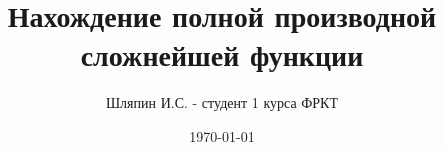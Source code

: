 \title{Нахождение полной производной сложнейшей функции}
\author{Шляпин И.С. - студент 1 курса ФРКТ}
\date{\today}
\maketitle